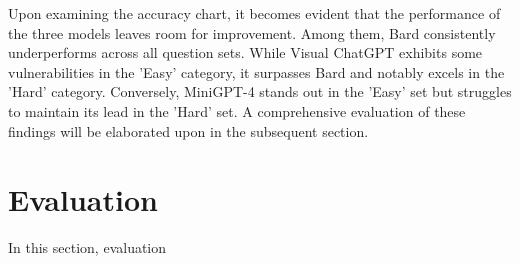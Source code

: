 \documentclass[journal,10pt]{IEEEtran}
\begin{document}
Upon examining the accuracy chart, it becomes evident that the performance of the three models leaves room for improvement. Among them, Bard consistently underperforms across all question sets. While Visual ChatGPT exhibits some vulnerabilities in the 'Easy' category, it surpasses Bard and notably excels in the 'Hard' category. Conversely, MiniGPT-4 stands out in the 'Easy' set but struggles to maintain its lead in the 'Hard' set. A comprehensive evaluation of these findings will be elaborated upon in the subsequent section.

\section{Evaluation}
In this section, evaluation 




\appendices

\label{Chart}
\clearpage

\label{Easy}

\label{Hard}
\end{document}
